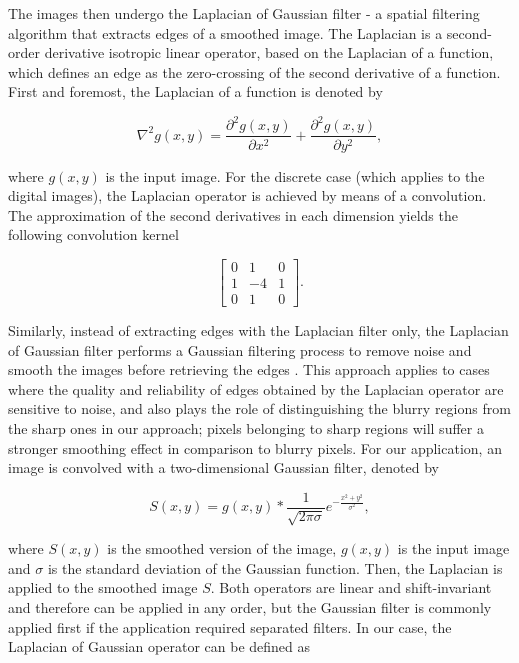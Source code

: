 The images then undergo the Laplacian of Gaussian filter - a spatial filtering algorithm that extracts edges of a smoothed image. The Laplacian is a second-order derivative isotropic linear operator, based on the Laplacian of a function, which defines an edge as the zero-crossing of the second derivative of a function. First and foremost, the Laplacian of a function is denoted by

\begin{equation}
\label{eqn:laplacian_of_function}
\nabla^{2}g(x,y) = \frac{\partial^{2} g(x,y)}{\partial x^{2}}
                    +
                  \frac{\partial^{2} g(x,y)}{\partial y^{2}},
\end{equation}

\noindent where $g(x,y)$ is the input image. For the discrete case (which applies to the digital images), the Laplacian operator is achieved by means of a convolution. The approximation of the second derivatives in each dimension yields the following convolution kernel

\begin{equation*}
\label{eqn:discrete_laplacian}
\begin{bmatrix}
0 & 1 & 0 \\
1 & -4 & 1 \\
0 & 1 & 0
\end{bmatrix}.
\end{equation*}

Similarly, instead of extracting edges with the Laplacian filter only, the Laplacian of Gaussian filter performs a Gaussian filtering process to remove noise and smooth the images before retrieving the edges \cite{marr1980theory}. This approach applies to cases where the quality and reliability of edges obtained by the Laplacian operator are sensitive to noise, and also plays the role of distinguishing the blurry regions from the sharp ones in our approach; pixels belonging to sharp regions will suffer a stronger smoothing effect in comparison to blurry pixels. For our application, an image is convolved with a two-dimensional Gaussian filter, denoted by

\begin{equation}
\label{eqn:gaussian_filter}
S(x,y) = g(x,y) \ast \frac{1}{\sqrt{2 \pi \sigma}} e^{- \frac{x^{2} + y^{2}}{\sigma^{2}}},
\end{equation}

\noindent where $S(x,y)$ is the smoothed version of the image, $g(x,y)$ is the input image and $\sigma$ is the standard deviation of the Gaussian function. Then, the Laplacian is applied to the smoothed image $S$. Both operators are linear and shift-invariant and therefore can be applied in any order, but the Gaussian filter is commonly applied first if the application required separated filters. In our case, the Laplacian of Gaussian operator can be defined as

